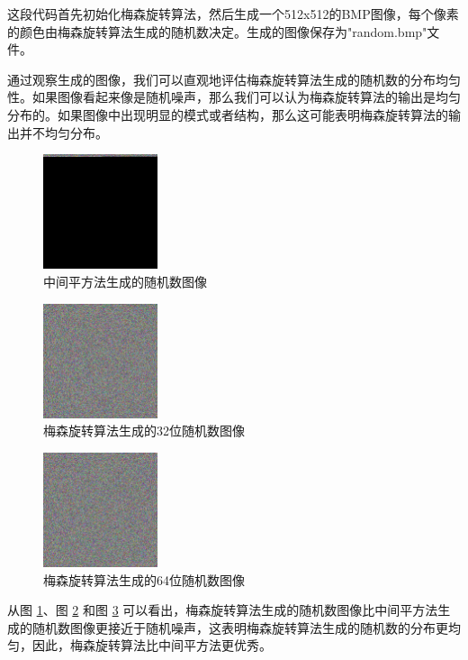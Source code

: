 \documentclass{ctexart}
\begin{document}
这段代码首先初始化梅森旋转算法，然后生成一个512x512的BMP图像，每个像素的颜色由梅森旋转算法生成的随机数决定。生成的图像保存为"random.bmp"文件。

通过观察生成的图像，我们可以直观地评估梅森旋转算法生成的随机数的分布均匀性。如果图像看起来像是随机噪声，那么我们可以认为梅森旋转算法的输出是均匀分布的。如果图像中出现明显的模式或者结构，那么这可能表明梅森旋转算法的输出并不均匀分布。

\begin{figure}[htbp]
\centering
\includegraphics[width=0.3\textwidth]{random_middle_square.png}
\caption{中间平方法生成的随机数图像}
\label{fig:middle_square}
\end{figure}

\begin{figure}[htbp]
\centering
\includegraphics[width=0.3\textwidth]{random32.png}
\caption{梅森旋转算法生成的32位随机数图像}
\label{fig:mersenne_32}
\end{figure}

\begin{figure}[htbp]
\centering
\includegraphics[width=0.3\textwidth]{random64.png}
\caption{梅森旋转算法生成的64位随机数图像}
\label{fig:mersenne_64}
\end{figure}

从图 \ref{fig:middle_square}、图 \ref{fig:mersenne_32} 和图 \ref{fig:mersenne_64} 可以看出，梅森旋转算法生成的随机数图像比中间平方法生成的随机数图像更接近于随机噪声，这表明梅森旋转算法生成的随机数的分布更均匀，因此，梅森旋转算法比中间平方法更优秀。
\end{document}

